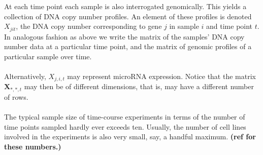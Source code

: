 \documentclass[a4paper]{article}
\theoremstyle{myexamplestyle}
\def\reminder#1{\marginpar{\rule[0pt]{1mm}{11pt}}\textbf{#1}}
\begin{document}
At each time point each sample is also interrogated genomically. This yields a collection of DNA copy number profiles. An element of these profiles is denoted  $X_{jit}$, the DNA copy number corresponding to gene $j$ in sample $i$ and time point $t$. In analogous fashion as above we write the matrix of the samples' DNA copy number data at a particular time point, and the matrix of genomic profiles of a particular sample over time.
\\
\\
Alternatively, $X_{j,i,t}$ may represent microRNA expression. Notice that the matrix $\mathbf{X}_{\ast, \ast, t}$ may then be of different dimensions, that is, may have a different number of rows.
\\
\\
The typical sample size of time-course experiments in terms of the number of time points sampled hardly ever exceeds ten. Usually, the number of cell lines involved in the experiments is also very small, say, a handful maximum. \reminder{(ref for these numbers.)}
\end{document}

